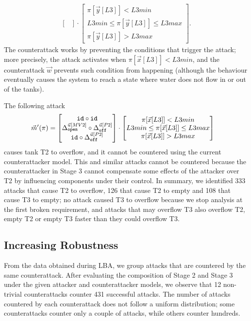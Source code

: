 {\begin{align*}
\begin{bmatrix}
  \end{bmatrix}
  \cdot
  \begin{bmatrix}
    \pi[\vec{y}[L3]]<L3min \\
    L3min \leq \pi[\vec{y}[L3]]\leq L3max \\
    \pi[\vec{y}[L3]]>L3max
  \end{bmatrix}.
\end{align*} 
The counterattack works by preventing the conditions that trigger the attack; more precisely, the attack activates when $\pi[\vec{x}[L3]]<L3min$, and the counterattack $\vec{w}$ prevents such condition from happening (although the behaviour eventually causes the system to reach a state where water does not flow in or out of the tanks). 

The following attack
\begin{align*}
    \vec{m}'(\pi)&=
    \begin{bmatrix}
     {\texttt{id}}\circ {\texttt{id}} \\
     {\Delta}^{\vec{u}[MV2]}_{\texttt{open}}\circ {\Delta}^{\vec{u}[P2]}_{\texttt{off}} \\
     {\texttt{id}}\circ {\Delta}^{\vec{u}[P2]}_{\texttt{off}} \\
    \end{bmatrix}
    \cdot
    \begin{bmatrix}
      \pi[\vec{x}[L3]]<L3min \\
      L3min \leq \pi[\vec{x}[L3]]\leq L3max \\
      \pi[\vec{x}[L3]]>L3max
    \end{bmatrix}
  \end{align*} 
causes tank T2 to overflow, and it cannot be countered using the current counterattacker model. This and similar attacks cannot be countered because the counterattacker in Stage 3 cannot compensate some effects of the attacker over T2 by influencing components under their control. In summary, we identified 333 attacks that cause T2 to overflow, 126 that cause T2 to empty and 108 that cause T3 to empty; no attack caused T3 to overflow because we stop analysis at the first broken requirement, and attacks that may overflow T3 also overflow T2, empty T2 or empty T3 faster than they could overflow T3.

\subsection{Increasing Robustness}
From the data obtained during LBA, we group attacks that are countered by the same counterattack. After evaluating the composition of Stage 2 and Stage 3 under the given attacker and counterattacker models, we observe that 12 non-trivial counterattacks counter 431 successful attacks. The number of attacks countered by each counterattack does not follow a uniform distribution; some counterattacks counter only a couple of attacks, while others counter hundreds. 

}
